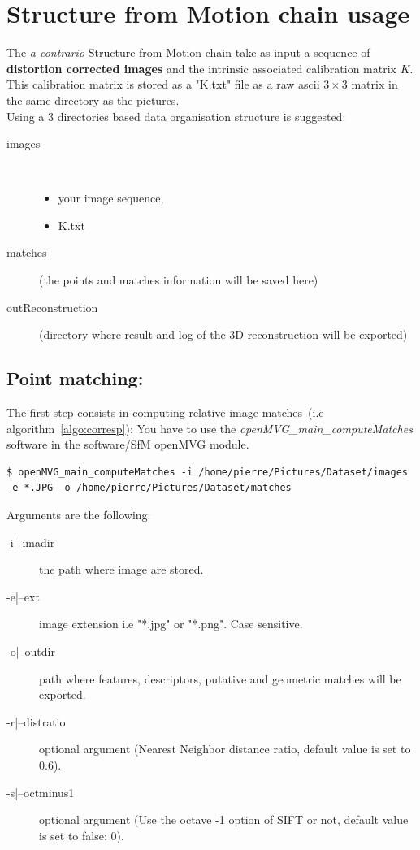 \documentclass[11pt, letterpaper]{report}
\begin{document}
\newpage
\section{Structure from Motion chain usage}

The {\em a contrario} Structure from Motion chain take as input a sequence of \textbf{distortion corrected images} and the intrinsic associated calibration matrix $K$. This calibration matrix is stored as a "K.txt" file as a raw ascii $3\times3$ matrix in the same directory as the pictures.\\
Using a 3 directories based data organisation structure is suggested:
\begin{description}
\item[images] ~
\begin{itemize}
\item your image sequence,
\item K.txt
\end{itemize}
\item[matches] (the points and matches information will be saved here)
\item[outReconstruction] (directory where result and log of the 3D reconstruction will be exported)
\end{description}

\subsection*{Point matching:}
The first step consists in computing relative image matches~(i.e algorithm~\ref{algo:corresp}):
You have to use the \textit{openMVG\_main\_computeMatches} software in the software/SfM openMVG module.
\vspace{-.5cm}
\begin{lstlisting}
$ openMVG_main_computeMatches -i /home/pierre/Pictures/Dataset/images -e *.JPG -o /home/pierre/Pictures/Dataset/matches
\end{lstlisting}
Arguments are the following:
\begin{description}
\item[-i|--imadir] the path where image are stored.
\item[-e|--ext] image extension i.e "*.jpg" or "*.png". Case sensitive.
\item[-o|--outdir] path where features, descriptors, putative and geometric matches will be exported.
\item[-r|--distratio] optional argument (Nearest Neighbor distance ratio, default value is set to 0.6).
\item[-s|--octminus1] optional argument (Use the octave -1 option of SIFT or not, default value is set to false: 0).
\end{description}
\end{document}
